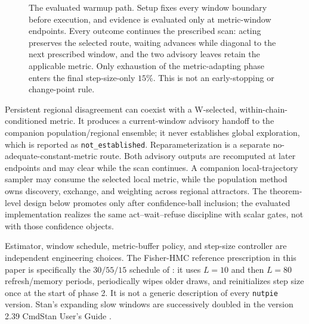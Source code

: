 \documentclass[11pt]{article}
\theoremstyle{plain}
\theoremstyle{definition}
\theoremstyle{remark}
\begin{document}
\begin{figure}[H]
{%
}
\caption{The evaluated warmup path. Setup fixes every window boundary before
execution, and evidence is evaluated only at metric-window endpoints. Every
outcome continues the prescribed scan: acting preserves the selected route,
waiting advances while diagonal to the next prescribed window, and the two advisory
leaves retain the applicable metric. Only exhaustion of the metric-adapting
phase enters the final step-size-only $15\%$. This is not an early-stopping or
change-point rule.}
\label{fig:warmup-path}
\end{figure}

Persistent regional disagreement can coexist with a W-selected,
within-chain-conditioned metric. It produces a current-window advisory handoff
to the companion population/regional ensemble; it never establishes global
exploration, which is reported as \texttt{not\_established}. Reparameterization
is a separate no-adequate-constant-metric route. Both advisory outputs are
recomputed at later endpoints and may clear while the scan continues. A
companion local-trajectory
sampler may consume the selected local metric, while the population method owns
discovery, exchange, and weighting across regional attractors. The theorem-level
design below promotes only after confidence-ball inclusion; the evaluated
implementation realizes the same act--wait--refuse discipline with scalar
gates, not with those confidence objects.

Estimator, window schedule, metric-buffer policy, and step-size controller are
independent engineering choices. The Fisher-HMC reference prescription in this
paper is specifically the $30/55/15$ schedule of
\citet{seyboldt2026preconditioning}: it uses $L=10$ and then $L=80$
refresh/memory periods, periodically wipes older draws, and reinitializes step
size once at the start of phase 2. It is not a generic description of every
\texttt{nutpie} version. Stan's expanding slow windows are successively doubled
in the version 2.39 CmdStan User's Guide \citep{cmdstan239warmup}.
\end{document}
